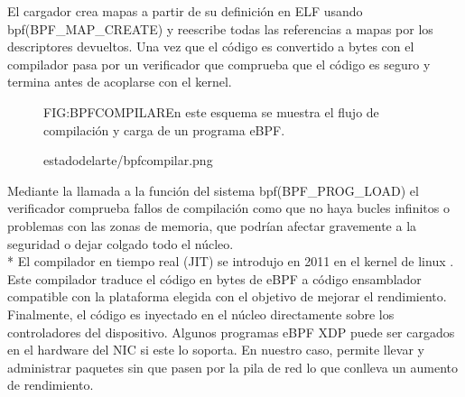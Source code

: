 El cargador crea mapas a partir de su definición en ELF usando bpf(BPF\_MAP\_CREATE) y reescribe todas las referencias a mapas por los descriptores devueltos. Una vez que el código es convertido a bytes con el compilador pasa por un verificador que comprueba que el código es seguro y termina antes de acoplarse con el kernel.
\begin{figure}[Flujo de compilación y carga de eBPF]{FIG:BPFCOMPILAR}{En este esquema se muestra el flujo de compilación y carga de un programa eBPF.}
  \begin{image}{}{}{estadodelarte/bpfcompilar.png}
  \end{image}
\end{figure}

Mediante la llamada a la función del sistema bpf(BPF\_PROG\_LOAD) el verificador comprueba fallos de compilación como que no haya bucles infinitos o problemas con las zonas de memoria, que podrían afectar gravemente a la seguridad o dejar colgado todo el núcleo. \\*
El compilador en tiempo real (JIT) se introdujo en 2011 en el kernel de linux \cite{JITkernel}. Este compilador traduce el código en bytes de eBPF a código ensamblador compatible con la plataforma elegida con el objetivo de mejorar el rendimiento.
Finalmente, el código es inyectado en el núcleo directamente sobre los controladores del dispositivo. Algunos programas eBPF XDP puede ser cargados en el hardware del NIC si este lo soporta. En nuestro caso, permite llevar y administrar paquetes sin que pasen por la pila de red lo que conlleva un aumento de rendimiento.